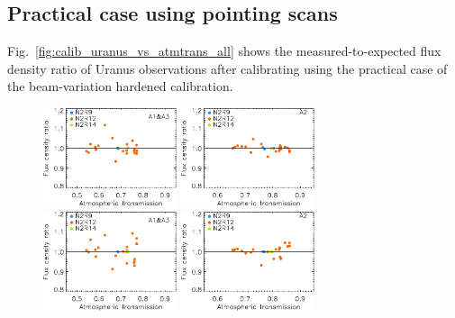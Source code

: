 \subsection{Practical case using pointing scans}
\label{se:photocorr_pointing}


Fig.~\ref{fig:calib_uranus_vs_atmtrans_all} shows the
measured-to-expected flux density ratio of Uranus observations after
calibrating using the practical case of the beam-variation
hardened calibration. 

\begin{figure}[ht!]
\begin{center}
    \includegraphics[clip=true, trim={0, -0.3cm, -0.3cm, 0}, width=0.35\textwidth]{Figures/Calibration/plot_flux_density_ratio_obstau_uranus_corrected_skydip_narrow_1mm.pdf}\hspace{0.2cm}
    \includegraphics[clip=true, trim={0, -0.3cm, -0.3cm, 0}, width=0.35\textwidth]{Figures/Calibration/plot_flux_density_ratio_obstau_uranus_corrected_skydip_narrow_a2.pdf}
    \vspace{0.3cm}
    \includegraphics[clip=true, trim={0, -0.3cm, -0.3cm, 0}, width=0.35\textwidth]{Figures/Calibration/plot_flux_density_ratio_obstau_uranus_tau225_narrow_1mm.pdf}\hspace{0.2cm}
    \includegraphics[clip=true, trim={0, -0.3cm, -0.3cm, 0}, width=0.35\textwidth]{Figures/Calibration/plot_flux_density_ratio_obstau_uranus_tau225_narrow_a2.pdf}

\end{center}
\end{figure}
